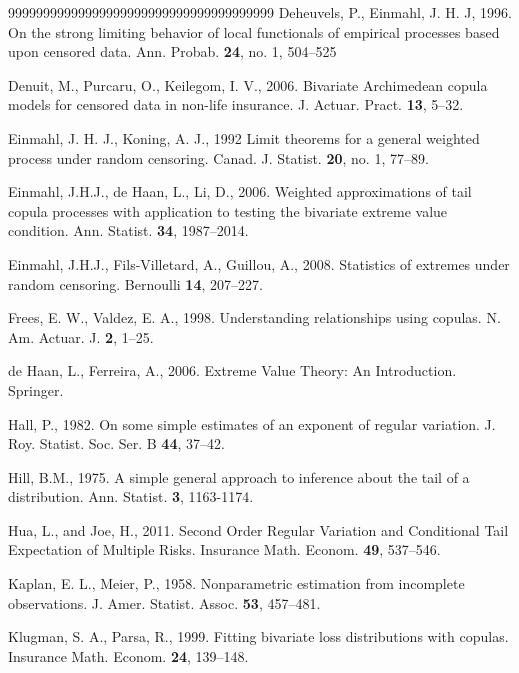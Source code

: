\documentclass[reqno,openbib,runningheads,a4paper,12pt]{amsart}%
\begin{document}
\begin{thebibliography}{99999999999999999999999999999999999999}
Deheuvels, P., Einmahl, J.
H. J, 1996. On the strong limiting behavior of local functionals of empirical
processes based upon censored data. Ann. Probab. \textbf{24}, no. 1, 504--525

Denuit, M., Purcaru, O.,
Keilegom, I. V., 2006. Bivariate Archimedean copula models for censored data
in non-life insurance. J. Actuar. Pract. \textbf{13}, 5--32.

Einmahl, J. H. J., Koning, A. J.,
1992 Limit theorems for a general weighted process under random censoring.
Canad. J. Statist. \textbf{20}, no. 1, 77--89.

Einmahl, J.H.J., de Haan, L.,
Li, D., 2006. Weighted approximations of tail copula processes with
application to testing the bivariate extreme value condition. Ann. Statist.
\textbf{34}, 1987--2014.

Einmahl, J.H.J.,
Fils-Villetard, A., Guillou, A., 2008. Statistics of extremes under random
censoring. Bernoulli \textbf{14}, 207--227.

Frees, E. W., Valdez, E. A., 1998.
Understanding relationships using copulas. N. Am. Actuar. J. \textbf{2}, 1--25.

de Haan, L., Ferreira, A., 2006.
Extreme Value Theory: An Introduction. Springer.

Hall, P., 1982. On some simple estimates of an
exponent of regular variation. J. Roy. Statist. Soc. Ser. B \textbf{44}, 37--42.

Hill, B.M., 1975. A simple general approach to
inference about the tail of a distribution. Ann. Statist. \textbf{3}, 1163-1174.

Hua, L., and Joe, H., 2011. Second Order
Regular Variation and Conditional Tail Expectation of Multiple Risks.
Insurance Math. Econom. \textbf{49}, 537--546.

Kaplan, E. L., Meier, P., 1958.
Nonparametric estimation from incomplete observations. J. Amer. Statist.
Assoc. \textbf{53}, 457--481.

Klugman, S. A., Parsa, R., 1999.
Fitting bivariate loss distributions with copulas. Insurance Math. Econom.
\textbf{24}, 139--148.


\end{thebibliography}
\end{document}
